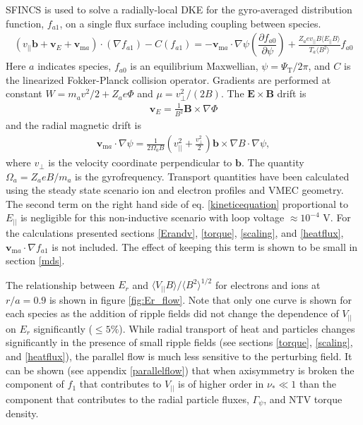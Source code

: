 \documentclass[aip, pop, preprint]{revtex4-1}
\numberwithin{figure}{section}
\numberwithin{equation}{section}
\newcommand{\partder}[2]{\dfrac{\partial  #1}{\partial  #2}} %
\begin{document}
SFINCS is used to solve a radially-local DKE for the gyro-averaged distribution function, $f_{a1}$, on a single flux surface including coupling between species. 
\begin{gather}
( v_{||} \bm{b} + \bm{v}_E + \bm{v}_{\text{m}a}) \cdot (\nabla f_{a1})  - C(f_{a1}) = - \bm{v}_{\text{m}a} \cdot \nabla \psi \left( \partder{f_{a0}}{\psi} \right) + \frac{Z_a e v_{||} B \langle E_{||} B \rangle}{T_a \langle B^2 \rangle } f_{a0}
\label{kineticequation}
\end{gather} 
\hspace{-1mm}
Here $a$ indicates species, $f_{a0}$ is an equilibrium Maxwellian, $\psi = \Psi_{\text{T}}/2\pi$, and $C$ is the linearized Fokker-Planck collision operator. Gradients are performed at constant $W = m_a v^2/2 + Z_a e \Phi$ and $\mu = v_{\perp}^2/(2B)$. The $\bm{E} \times \bm{B}$ drift is 
\begin{gather}
\bm{v}_E = \frac{1}{B^2} \bm{B} \times \nabla \Phi
\end{gather} 
and the radial magnetic drift is
\begin{gather}
\bm{v}_{\text{m}a} \cdot \nabla \psi = \frac{1}{2\Omega_a B} \left(v_{||}^2 + \frac{v_{\perp}^2}{2} \right) \bm{b} \times \nabla B \cdot \nabla \psi,
\label{magneticdrift}
\end{gather} 
where $v_{\perp}$ is the velocity coordinate perpendicular to $\bm{b}$. The quantity $\Omega_a = Z_aeB/m_a$ is the gyrofrequency. Transport quantities have been calculated using the steady state scenario ion and electron profiles and VMEC geometry. The second term on the right hand side of eq. \ref{kineticequation} proportional to $E_{||}$ is negligible for this non-inductive scenario with loop voltage $ \approx 10^{-4}$ V. For the calculations presented sections \ref{Erandv}, \ref{torque}, \ref{scaling}, and \ref{heatflux}, $\bm{v}_{\text{m}a} \cdot \nabla f_{a1}$ is not included. The effect of keeping this term is shown to be small in section \ref{mds}.

The relationship between $E_r$ and $\langle V_{||} B \rangle/\langle B^2 \rangle^{1/2}$ for electrons and ions at $r/a = 0.9$ is shown in figure \ref{fig:Er_flow}. Note that only one curve is shown for each species as the addition of ripple fields did not change the dependence of $V_{||}$ on $E_r$ significantly ($\leq 5 \%$). While radial transport of heat and particles changes significantly in the presence of small ripple fields (see sections \ref{torque}, \ref{scaling}, and \ref{heatflux}), the parallel flow is much less sensitive to the perturbing field. It can be shown (see appendix \ref{parallelflow}) that when axisymmetry is broken the component of $f_1$ that contributes to $V_{||}$ is of higher order in $\nu_* \ll 1 $ than the component that contributes to the radial particle fluxes, $\Gamma_{\psi}$, and NTV torque density. 
\end{document}
